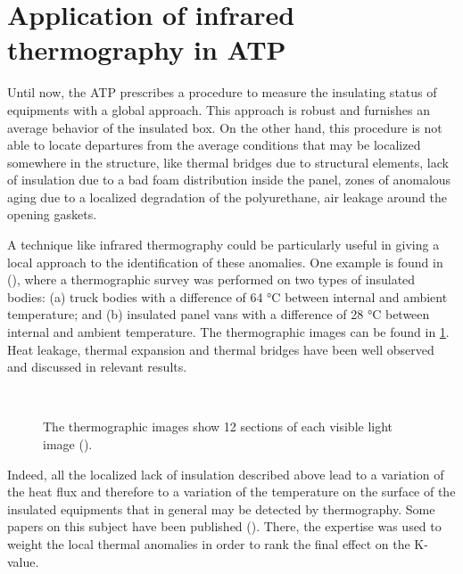 \section{Application of infrared thermography in ATP}
Until now, the ATP prescribes a procedure to measure the insulating status of equipments with a global approach. This approach is robust and furnishes an average behavior of the insulated box. On the other hand, this procedure is not able to locate departures from the average conditions that may be localized somewhere in the structure, like thermal bridges due to structural elements, lack of insulation due to a bad foam distribution inside the panel, zones of anomalous aging due to a localized degradation of the polyurethane, air leakage around the opening gaskets. 

A technique like infrared thermography could be particularly useful in giving a local approach to the identification of these anomalies. One example is found in (\citet{Estrada-Flores1996use}), where a thermographic survey was performed on two types of insulated bodies: (a) truck bodies with a difference of 64 °C between internal and ambient temperature; and (b) insulated panel vans with a difference of 28 °C between internal and ambient temperature. The thermographic images can be found in \ref{Estrada-Flores1996use}. Heat leakage, thermal expansion and thermal bridges have been well observed and discussed in relevant results. 

\begin{figure}[htbp]
	\centering
	\\
	\caption{The thermographic images show 12 sections of each visible light image (\citet{Estrada-Flores1996use}).}
	\label{Estrada-Flores1996use}
\end{figure}

Indeed, all the localized lack of insulation described above lead to a variation of the heat flux and therefore to a variation of the temperature on the surface of the insulated equipments that in general may be detected by thermography. Some papers on this subject have been published (\citet{grinzatoquality,grinzato1comparison}). There, the expertise was used to weight the local thermal anomalies in order to rank the final effect on the K-value. %

